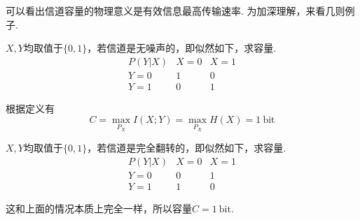可以看出信道容量的物理意义是有效信息最高传输速率. 为加深理解，来看几则例子. 
\begin{example}
    $X,Y$均取值于$\{0,1\}$，若信道是无噪声的，即似然如下，求容量.
    \[
    \begin{array}{c|c|c}
        P(Y|X) & X=0 & X=1 \\ \hline 
        Y=0 & 1 & 0 \\ \hline 
        Y=1 & 0 & 1        
    \end{array}
    \]
\end{example}
\begin{solution}根据定义有
    \[
        C = \max_{P_X} I(X;Y) = \max_{P_X} H(X) = 1 \ \text{bit}
    \]
\end{solution}

\begin{example}
    $X,Y$均取值于$\{0,1\}$，若信道是完全翻转的，即似然如下，求容量.
    \[
    \begin{array}{c|c|c}
        P(Y|X) & X=0 & X=1 \\ \hline 
        Y=0 & 0 & 1 \\ \hline 
        Y=1 & 1 & 0        
    \end{array}
    \]
\end{example}
\begin{solution}
    这和上面的情况本质上完全一样，所以容量$C=1 \ \text{bit}$. 
\end{solution}
